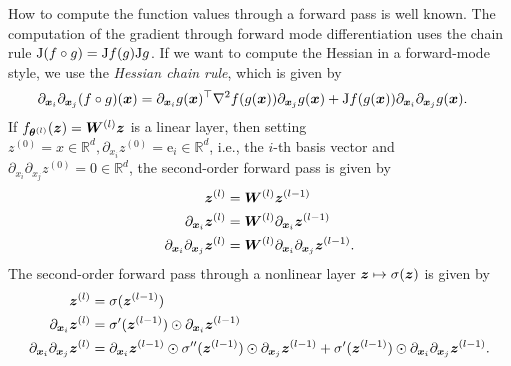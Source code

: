 How to compute the function values through a forward pass is well known.
The computation of the gradient through forward mode differentiation uses the chain rule $\mathrm{J} (f\circ g) = \mathrm{J} f (g) \mathrm{J} g$.
If we want to compute the Hessian in a forward-mode style, we use the \emph{Hessian chain rule}, which is given by
\begin{align}
       \partial_{{\bm{x}}_i} \partial_{{\bm{x}}_j} (f \circ g)({\bm{x}}) & = \partial_{{\bm{x}}_i} g({\bm{x}})^\top \nabla^2f(g({\bm{x}}))\partial_{{\bm{x}}_j} g({\bm{x}}) + \mathrm{J} f(g({\bm{x}})) \partial_{{\bm{x}}_i} \partial_{{\bm{x}}_j} g({\bm{x}}).
\end{align}
If $f_{\vtheta^{(l)}}(\vz) = \mW^{(l)} \vz %
$ is a linear layer, then setting $z^{(0)} = x\in\mathbb R^d, \partial_{x_i}z^{(0)} = \textrm{e}_i\in\mathbb R^d$, i.e., the $i$-th basis vector and $\partial_{x_i}\partial_{x_j}z^{(0)} = 0\in\mathbb R^d$, the second-order forward pass is given by
\begin{subequations}
    \begin{align}
    \vz^{(l)} & = \mW^{(l)} \vz^{(l-1)} %
    \\
    \partial_{\vx_i} \vz^{(l)} & = \mW^{(l)} \partial_{\vx_i} \vz^{(l-1)} \\
    \partial_{\vx_i}\partial_{\vx_j} \vz^{(l)} & = \mW^{(l)} \partial_{\vx_i}\partial_{\vx_j} \vz^{(l-1)} \label{subeq:secondOrderForward-LinearLayer}.
\end{align}
\end{subequations}
The second-order forward pass through a nonlinear layer ${\bm{z}}\mapsto \sigma({\bm{z}})$ is given by
\begin{subequations}
    \begin{align}
    {\bm{z}}^{(l)} & = \sigma({\bm{z}}^{(l-1)}) \\
    \partial_{{\bm{x}}_i} {\bm{z}}^{(l)} & = \sigma'({\bm{z}}^{(l-1)}) \odot \partial_{{\bm{x}}_i} {\bm{z}}^{(l-1)} \\
    \partial_{{\bm{x}}_i}\partial_{{\bm{x}}_j} {\bm{z}}^{(l)} & = \partial_{{\bm{x}}_i} {\bm{z}}^{(l-1)} \odot \sigma''({\bm{z}}^{(l-1)}) \odot \partial_{{\bm{x}}_j} {\bm{z}}^{(l-1)} + \sigma'({\bm{z}}^{(l-1)}) \odot \partial_{{\bm{x}}_i} \partial_{{\bm{x}}_j} {\bm{z}}^{(l-1)} \label{subeq:secondOrderForward-nonlinearLayer}.
\end{align}
\end{subequations}



